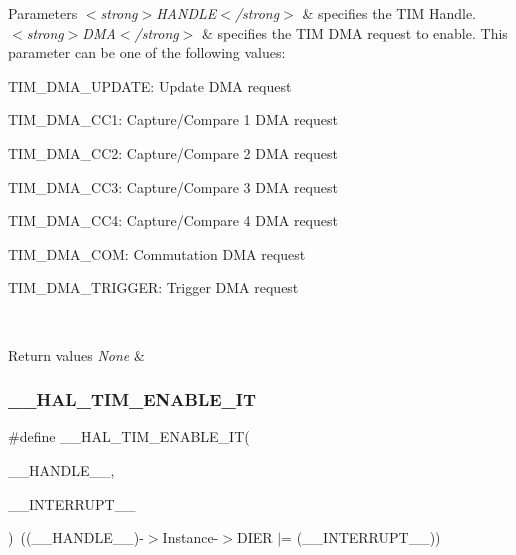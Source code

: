 \begin{DoxyParams}{Parameters}
{\em $<$strong$>$\+H\+A\+N\+D\+L\+E$<$/strong$>$} & specifies the T\+IM Handle. \\
\hline
{\em $<$strong$>$\+D\+M\+A$<$/strong$>$} & specifies the T\+IM D\+MA request to enable. This parameter can be one of the following values\+: \begin{DoxyItemize}
\item T\+I\+M\+\_\+\+D\+M\+A\+\_\+\+U\+P\+D\+A\+TE\+: Update D\+MA request \item T\+I\+M\+\_\+\+D\+M\+A\+\_\+\+C\+C1\+: Capture/\+Compare 1 D\+MA request \item T\+I\+M\+\_\+\+D\+M\+A\+\_\+\+C\+C2\+: Capture/\+Compare 2 D\+MA request \item T\+I\+M\+\_\+\+D\+M\+A\+\_\+\+C\+C3\+: Capture/\+Compare 3 D\+MA request \item T\+I\+M\+\_\+\+D\+M\+A\+\_\+\+C\+C4\+: Capture/\+Compare 4 D\+MA request \item T\+I\+M\+\_\+\+D\+M\+A\+\_\+\+C\+OM\+: Commutation D\+MA request \item T\+I\+M\+\_\+\+D\+M\+A\+\_\+\+T\+R\+I\+G\+G\+ER\+: Trigger D\+MA request \end{DoxyItemize}
\\
\hline
\end{DoxyParams}

\begin{DoxyRetVals}{Return values}
{\em None} & \\
\hline
\end{DoxyRetVals}
\mbox{\label{group___t_i_m___exported___macros_ga4d69943bc4716743c78e3194e259097e}} 
\subsubsection{\texorpdfstring{\+\_\+\+\_\+\+H\+A\+L\+\_\+\+T\+I\+M\+\_\+\+E\+N\+A\+B\+L\+E\+\_\+\+IT}{\_\_HAL\_TIM\_ENABLE\_IT}}
{\footnotesize\ttfamily \#define \+\_\+\+\_\+\+H\+A\+L\+\_\+\+T\+I\+M\+\_\+\+E\+N\+A\+B\+L\+E\+\_\+\+IT(\begin{DoxyParamCaption}\item[{}]{\+\_\+\+\_\+\+H\+A\+N\+D\+L\+E\+\_\+\+\_\+,  }\item[{}]{\+\_\+\+\_\+\+I\+N\+T\+E\+R\+R\+U\+P\+T\+\_\+\+\_\+ }\end{DoxyParamCaption})~((\+\_\+\+\_\+\+H\+A\+N\+D\+L\+E\+\_\+\+\_\+)-\/$>$Instance-\/$>$D\+I\+ER $\vert$= (\+\_\+\+\_\+\+I\+N\+T\+E\+R\+R\+U\+P\+T\+\_\+\+\_\+))}



